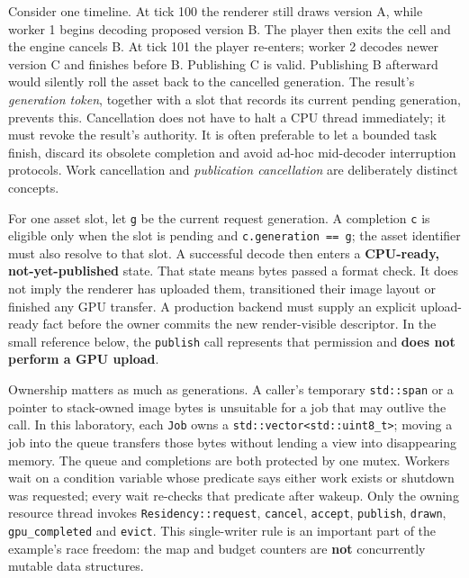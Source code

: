 Consider one timeline. At tick 100 the renderer still draws version A, while worker 1 begins decoding proposed version B. The player then exits the cell and the engine cancels B. At tick 101 the player re-enters; worker 2 decodes newer version C and finishes before B. Publishing C is valid. Publishing B afterward would silently roll the asset back to the cancelled generation. The result's \emph{generation token}, together with a slot that records its current pending generation, prevents this. Cancellation does not have to halt a CPU thread immediately; it must revoke the result's authority. It is often preferable to let a bounded task finish, discard its obsolete completion and avoid ad-hoc mid-decoder interruption protocols. Work cancellation and \emph{publication cancellation} are deliberately distinct concepts.

For one asset slot, let \texttt{g} be the current request generation. A completion \texttt{c} is eligible only when the slot is pending and \texttt{c.generation\ ==\ g}; the asset identifier must also resolve to that slot. A successful decode then enters a \textbf{CPU-ready, not-yet-published} state. That state means bytes passed a format check. It does not imply the renderer has uploaded them, transitioned their image layout or finished any GPU transfer. A production backend must supply an explicit upload-ready fact before the owner commits the new render-visible descriptor. In the small reference below, the \texttt{publish} call represents that permission and \textbf{does not perform a GPU upload}.

Ownership matters as much as generations. A caller's temporary \texttt{std::span} or a pointer to stack-owned image bytes is unsuitable for a job that may outlive the call. In this laboratory, each \texttt{Job} owns a \texttt{std::vector\textless{}std::uint8\_t\textgreater{}}; moving a job into the queue transfers those bytes without lending a view into disappearing memory. The queue and completions are both protected by one mutex. Workers wait on a condition variable whose predicate says either work exists or shutdown was requested; every wait re-checks that predicate after wakeup. Only the owning resource thread invokes \texttt{Residency::request}, \texttt{cancel}, \texttt{accept}, \texttt{publish}, \texttt{drawn}, \texttt{gpu\_completed} and \texttt{evict}. This single-writer rule is an important part of the example's race freedom: the map and budget counters are \textbf{not} concurrently mutable data structures.

